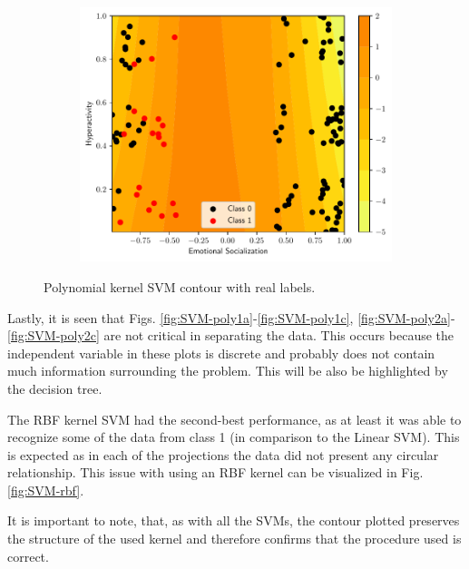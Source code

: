 \begin{figure}
\begin{subfigure}[b]{0.32\textwidth}
    \centering \includegraphics[width=\textwidth]{figs/svm-poly-contour-2-5.pdf}
    \caption{}
    \label{fig:SVM-poly3c}
  \end{subfigure}
  \caption{Polynomial kernel SVM contour with real labels.}
  \label{fig:SVM-poly}
\end{figure}

Lastly, it is seen that Figs. \ref{fig:SVM-poly1a}-\ref{fig:SVM-poly1c},
\ref{fig:SVM-poly2a}-\ref{fig:SVM-poly2c} are not critical in separating the
data. This occurs because the independent variable in these plots is discrete
and probably does not contain much information surrounding the problem. This
will be also be highlighted by the decision tree.

The RBF kernel SVM had the second-best performance, as at least it was able to
recognize some of the data from class 1 (in comparison to the Linear SVM). This
is expected as in each of the projections the data did not present any circular
relationship. This issue with using an RBF kernel can be visualized in Fig.
\ref{fig:SVM-rbf}.

It is important to note, that, as with all the SVMs, the contour plotted
preserves the structure of the used kernel and therefore confirms that the
procedure used is correct.

